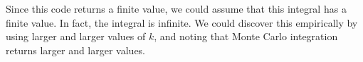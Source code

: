 Since this code returns a finite value, we could assume that this integral has a finite value.
In fact, the integral is infinite.
We could discover this empirically by using larger and larger values of $k$, and noting that Monte Carlo integration returns larger and larger values.

